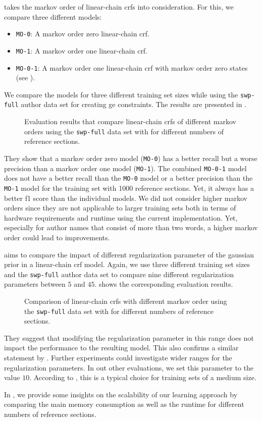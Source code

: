  takes the \gls{markov order} of \glspl{linear-chain crf} into consideration.
For this, we compare three different models:
\begin{itemize}
  \item \texttt{MO-0}: A \gls{markov order} zero \gls{linear-chain crf}.
  \item \texttt{MO-1}: A \gls{markov order} one \gls{linear-chain crf}.
  \item \texttt{MO-0-1}: A \gls{markov order} one \gls{linear-chain crf} with \gls{markov order} zero states (see ).
\end{itemize}
We compare the models for three different training set sizes while using the \texttt{swp-full} author data set for creating \gls{ge} constraints.
The results are presented in .
\begin{figure}

\caption{Evaluation results that compare \glspl{linear-chain crf} of different \glspl{markov order} using the \texttt{swp-full} data set with for different numbers of reference sections.}
\label{fig:eval-markov-orders}
\end{figure}
They show that a \gls{markov order} zero model (\texttt{MO-0}) has a better \gls{recall} but a worse \gls{precision} than a \gls{markov order} one model (\texttt{MO-1}).
The combined \texttt{MO-0-1} model does not have a better recall than the \texttt{MO-0} model or a better precision than the \texttt{MO-1} model for the training set with \num{1000} reference sections.
Yet, it always has a better \gls{f1 score} than the individual models.
We did not consider higher \glspl{markov order} since they are not applicable to larger training sets both in terms of hardware requirements and runtime using the current implementation.
Yet, especially for author names that consist of more than two words, a higher \gls{markov order} could lead to improvements.

\bigskip

 aims to compare the impact of different \gls{regularization parameter} of the \gls{gaussian prior} in a \gls{linear-chain crf} model.
Again, we use three different training set sizes and the \texttt{swp-full} author data set to compare nine different \glspl{regularization parameter} between $5$ and $45$.
 shows the corresponding evaluation results.
\begin{figure}

\caption{Comparison of \glspl{linear-chain crf} with different \gls{markov order} using the \texttt{swp-full} data set with for different numbers of reference sections.}
\label{fig:eval-gaussian}
\end{figure}
They suggest that modifying the \gls{regularization parameter} in this range does not impact the performance to the resulting model.
This also confirms a similar statement by \citet{sutton2010introduction}.
Further experiments could investigate wider ranges for the \glspl{regularization parameter}.
In out other evaluations, we set this parameter to the value $10$.
According to \citet{sutton2010introduction}, this is a typical choice for training sets of a medium size.

\bigskip

In , we provide some insights on the scalability of our learning approach by comparing the main memory consumption as well as the runtime for different numbers of reference sections.

